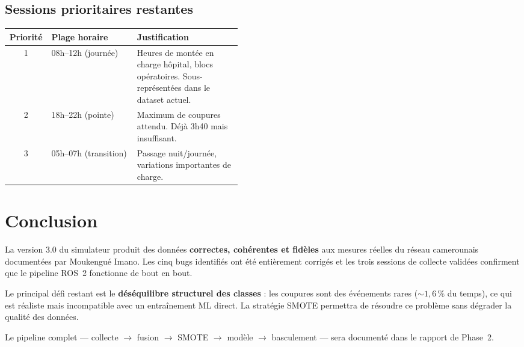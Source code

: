 \documentclass[12pt,a4paper]{article}
\begin{document}
\subsection{Sessions prioritaires restantes}

\begin{center}
\begin{tabular}{clp{0.45\linewidth}}
\toprule
\textbf{Priorité} & \textbf{Plage horaire} & \textbf{Justification} \\
\midrule
1 & 08h–12h (journée) &
  Heures de montée en charge hôpital, blocs opératoires.
  Sous-représentées dans le dataset actuel. \\
2 & 18h–22h (pointe) &
  Maximum de coupures attendu. Déjà 3h40 mais insuffisant. \\
3 & 05h–07h (transition) &
  Passage nuit/journée, variations importantes de charge. \\
\bottomrule
\end{tabular}
\end{center}

\section*{Conclusion}

La version 3.0 du simulateur produit des données \textbf{correctes,
cohérentes et fidèles} aux mesures réelles du réseau camerounais
documentées par Moukengué Imano. Les cinq bugs identifiés ont été
entièrement corrigés et les trois sessions de collecte validées
confirment que le pipeline ROS~2 fonctionne de bout en bout.

Le principal défi restant est le \textbf{déséquilibre structurel
des classes} : les coupures sont des événements rares ($\sim 1{,}6\,\%$
du temps), ce qui est réaliste mais incompatible avec un entraînement
ML direct. La stratégie SMOTE permettra de résoudre ce problème sans
dégrader la qualité des données.

Le pipeline complet — collecte $\to$ fusion $\to$ SMOTE $\to$ modèle
$\to$ basculement — sera documenté dans le rapport de Phase~2.
\end{document}
